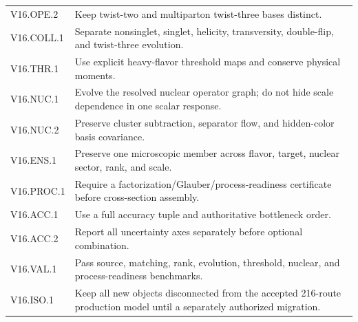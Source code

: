 \documentclass[11pt]{article}
\begin{document}
\begin{longtable}{L{0.17\textwidth}L{0.75\textwidth}}
V16.OPE.2 & Keep twist-two and multiparton twist-three bases distinct.\\
V16.COLL.1 & Separate nonsinglet, singlet, helicity, transversity, double-flip, and twist-three evolution.\\
V16.THR.1 & Use explicit heavy-flavor threshold maps and conserve physical moments.\\
V16.NUC.1 & Evolve the resolved nuclear operator graph; do not hide scale dependence in one scalar response.\\
V16.NUC.2 & Preserve cluster subtraction, separator flow, and hidden-color basis covariance.\\
V16.ENS.1 & Preserve one microscopic member across flavor, target, nuclear sector, rank, and scale.\\
V16.PROC.1 & Require a factorization/Glauber/process-readiness certificate before cross-section assembly.\\
V16.ACC.1 & Use a full accuracy tuple and authoritative bottleneck order.\\
V16.ACC.2 & Report all uncertainty axes separately before optional combination.\\
V16.VAL.1 & Pass source, matching, rank, evolution, threshold, nuclear, and process-readiness benchmarks.\\
V16.ISO.1 & Keep all new objects disconnected from the accepted 216-route production model until a separately authorized migration.\\
\bottomrule
\end{longtable}
\normalsize
\end{document}
